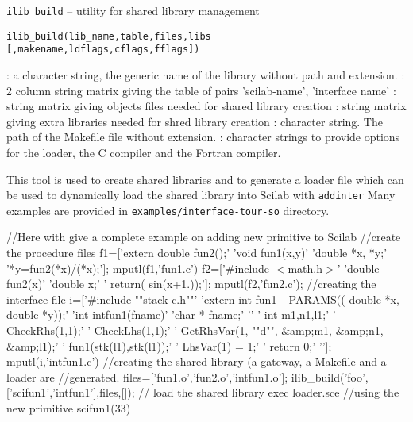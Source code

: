 
\begin{mandesc}
  \texttt{ilib\_build} --  utility for shared library management\\ %
\end{mandesc}
\label{ilib-build}
\begin{calling_sequence}
\begin{verbatim}
ilib_build(lib_name,table,files,libs [,makename,ldflags,cflags,fflags])  
\end{verbatim}
\end{calling_sequence}
\begin{parameters}
  \begin{varlist}
     : a character string, the generic name of the library without path and extension.
     : 2 column string matrix giving the table of pairs 'scilab-name', 'interface name'
     : string matrix giving objects files needed for shared library creation
     : string matrix giving extra libraries needed for shred library creation
     : character string. The path of the Makefile file without extension.
     : character strings to provide options for the loader, the C compiler and the Fortran compiler.
  \end{varlist}
\end{parameters}
\begin{mandescription}
  This tool is used to create shared libraries and to generate a 
  loader file which can be used to dynamically load the shared library 
  into Scilab with \verb!addinter!
  Many examples are provided in \verb!examples/interface-tour-so!
  directory.
\end{mandescription}
\begin{examples}
  \begin{program}
    //Here with give a complete example on adding new primitive to Scilab
    //create the procedure files
    f1=['extern double fun2();'
      'void fun1(x,y)'
      'double *x, *y;'
      '{*y=fun2(*x)/(*x);}'];
    mputl(f1,'fun1.c')
    f2=['#include $<$math.h$>$'
      'double fun2(x)'
      'double x;'
      '{ return( sin(x+1.));}'];
    mputl(f2,'fun2.c');
    //creating the interface file
    i=['#include ""stack-c.h""'
      'extern int fun1 _PARAMS(( double *x, double *y));'
      'int intfun1(fname)' 
      'char * fname;'
      '{'
        '  int m1,n1,l1;'
        '  CheckRhs(1,1);'
        '  CheckLhs(1,1);'
        '  GetRhsVar(1, ""d"", \&amp;m1, \&amp;n1, \&amp;l1);'
        '  fun1(stk(l1),stk(l1));'
        '  LhsVar(1) = 1;'
        '  return 0;'
        '}'];
    mputl(i,'intfun1.c')
    //creating the shared library (a gateway, a Makefile and a loader are 
    //generated. 
    files=['fun1.o','fun2.o','intfun1.o'];
    ilib_build('foo',['scifun1','intfun1'],files,[]);
    // load the shared library 
    exec loader.sce 
    //using the new primitive
    scifun1(33)
  \end{program}
\end{examples}
